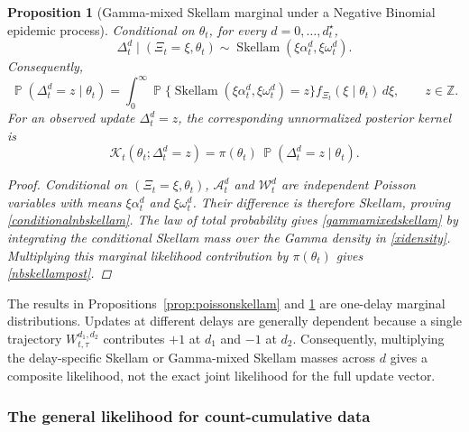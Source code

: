 \documentclass{article}
\newtheorem{proposition}{Proposition}
\theoremstyle{definition}
\theoremstyle{remark}
\newcommand{\Sk}{\operatorname{Skellam}}
\newcommand{\Prb}{\operatorname{\mathbb{P}}}
\begin{document}
\begin{proposition}[Gamma-mixed Skellam marginal under a Negative Binomial epidemic process]\label{prop:nbskellam}
Conditional on $\theta_t$, for every $d=0,\dots,d_t^{\star}$,
\begin{equation}\label{conditionalnbskellam}
    \Delta_t^d\mid(\Xi_t=\xi,\theta_t)
    \sim
    \Sk(\xi\alpha_t^d,\xi\omega_t^d).
\end{equation}
Consequently,
\begin{equation}\label{gammamixedskellam}
    \Prb(\Delta_t^d=z\mid\theta_t)
    =
    \int_0^\infty
    \Prb\{\Sk(\xi\alpha_t^d,\xi\omega_t^d)=z\}
    f_{\Xi_t}(\xi\mid\theta_t)\,d\xi,
    \qquad z\in\mathbb Z.
\end{equation}
For an observed update $\Delta_t^d=z$, the corresponding unnormalized posterior kernel is
\begin{equation}\label{nbskellampost}
    \mathcal K_t(\theta_t;\Delta_t^d=z)
    =
    \pi(\theta_t)\,
    \Prb(\Delta_t^d=z\mid\theta_t).
\end{equation}
\begin{proof}
Conditional on $(\Xi_t=\xi,\theta_t)$, $\mathcal A_t^d$ and $\mathcal W_t^d$ are independent Poisson variables with means $\xi\alpha_t^d$ and $\xi\omega_t^d$. Their difference is therefore Skellam, proving \eqref{conditionalnbskellam}. The law of total probability gives \eqref{gammamixedskellam} by integrating the conditional Skellam mass over the Gamma density in \eqref{xidensity}. Multiplying this marginal likelihood contribution by $\pi(\theta_t)$ gives \eqref{nbskellampost}.
\end{proof}
\end{proposition}

The results in Propositions~\ref{prop:poissonskellam} and \ref{prop:nbskellam} are one-delay marginal distributions. Updates at different delays are generally dependent because a single trajectory $W_{t,\tau}^{d_1,d_2}$ contributes $+1$ at $d_1$ and $-1$ at $d_2$. Consequently, multiplying the delay-specific Skellam or Gamma-mixed Skellam masses across $d$ gives a composite likelihood, not the exact joint likelihood for the full update vector.

\subsubsection{The general likelihood for count-cumulative data}
\end{document}
